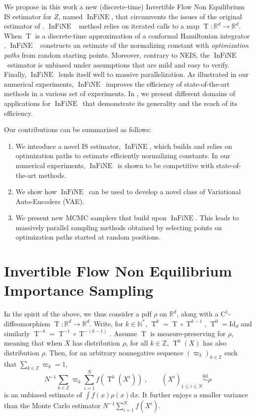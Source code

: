 \documentclass{article}
\def\simiid{\overset{\operatorname{iid}}{\sim}}
\def\IFIS{\ensuremath{\operatorname{InFiNE}}}
\def\transfo{\operatorname{T}}
\def\rmd{\operatorname{d}\hspace{-2pt}}
\def\rset{\mathbb{R}}
\def\nsets{\mathbb{N}^*}
\def\rmd{\mathrm{d}}
\def\eqsp{\,}
\def\eqsp{\;}
\newcommand{\1}{\mathds{1}}
\def\rset{\mathbb{R}}
\def\zset{\mathbb{Z}}
\def\nsets{\mathbb{N}^*}
\def\rmd{\mathrm{d}}
\def\rmC{\mathrm{C}}
\def\Idd{\mathrm{Id}}
\begin{document}
 We propose in this work  a new (discrete-time) Invertible Flow Non Equilibrium IS estimator for $Z$, named $\IFIS$, that circumvents the issues of the original estimator of \cite{rotskoff:vanden-eijden:2019}. \IFIS~ method relies on  iterated calls to a map $\transfo : \rset^{d} \to \rset^{d}$.
When $\transfo$ is a discrete-time approximation of a conformal Hamiltonian integrator \cite{francca2019conformal}, \IFIS~ constructs an estimate of the normalizing constant with \emph {optimization paths} from random starting points.
Moreover, contrary to NEIS, the \IFIS~estimator is  unbiased under assumptions that are mild and easy to verify. Finally, \IFIS\ lends itself well to massive parallelization.
As illustrated in our numerical experiments, \IFIS\ improves the efficiency of state-of-the-art methods in a various set of experiments.
In , we present  different domains of applications for \IFIS\ that demonstrate its generality and the reach of its efficiency.

Our contributions can be summarized as follows:

\begin{enumerate}[label=\textbf{(\roman*)}]
    \item We introduce a novel IS estimator, \IFIS, which builds and relies on optimization paths to estimate efficiently normalizing constants. In our numerical experiments, \IFIS\ is shown to be competitive with state-of-the-art methods.
    \item We show how \IFIS\ can be used to develop a novel class of Variational Auto-Encoders (VAE). 
    \item We present new MCMC samplers that build upon \IFIS. This leads to massively parallel sampling methods obtained by selecting points on optimization paths started at random positions.
\end{enumerate}

\section{Invertible Flow Non Equilibrium Importance Sampling}\label{sec:IFIS}
In the spirit of the above, we thus consider a pdf $\rho$ on $\rset^{d}$, along with a $\rmC^1$-diffeomorphism
$\transfo:\rset^{d}\to \rset^{d}$. Write, for $k \in \nsets$, $\transfo^{k}=\transfo\circ\transfo^{k-1}$, $\transfo^{0}=\Idd_{d}$ and similarly $\transfo^{-k}=\transfo^{-1}\circ\transfo^{-(k-1)}$. Assume $\transfo$ is measure-preserving for $\rho$, meaning that when $X$ has distribution $\rho$, for all $k\in \zset$, $\transfo^k(X)$ has also distribution $\rho$. Then,
for an arbitrary nonnegative sequence $(\varpi_k)_{k \in\zset}$ such that
$\sum_{k\in \zset} \varpi_k=1$, 
$$N^{-1} \sum_{k\in \zset} \varpi_k\sum_{i=1}^N  f(\transfo^k(X^i))\eqsp,\qquad(X^i)_{1\le i\le N}\simiid\rho$$ is an unbiased estimate of $\int f(x) \rho(x) \rmd x$. It further enjoys a smaller variance
than the Monte Carlo estimator $N^{-1} \sum_{i=1}^Nf(X^i)$.
\end{document}
